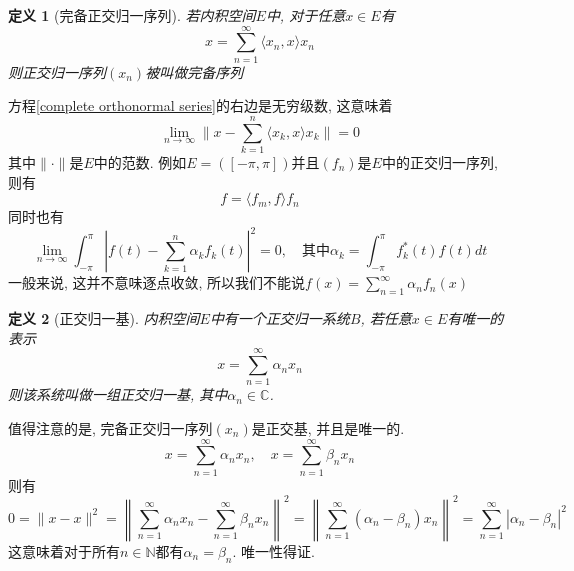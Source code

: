 \documentclass[a4paper,11pt]{book}
\newtheorem{definition}{\hspace{2em}定义}[section]
\begin{document}
\begin{definition}[完备正交归一序列]
  若内积空间$E$中, 对于任意$x\in E$有
  \begin{equation}\label{complete orthonormal series}
    x=\sum_{n=1}^{\infty}\langle x_n,x\rangle x_n
  \end{equation}
  则正交归一序列$(x_n)$被叫做完备序列
\end{definition}
方程\eqref{complete orthonormal series}的右边是无穷级数, 这意味着
\begin{equation*}
  \lim_{n\to\infty}\|x-\sum_{k=1}^{n}\langle x_k,x\rangle x_k\|=0
\end{equation*}
其中$\|\cdot\|$是$E$中的范数. 例如$E=([-\pi,\pi])$并且$(f_n)$是$E$中的正交归一序列, 则有
\begin{equation*}
  f=\langle f_m,f\rangle f_n
\end{equation*}
同时也有
\begin{equation*}
  \lim_{n\to\infty}\int_{-\pi}^{\pi}\left|f(t)-\sum_{k=1}^{n}\alpha_k f_k(t)\right|^2=0,\quad \text{其中}\alpha_k=\int_{-\pi}^{\pi}f_k^*(t)f(t)dt
\end{equation*}
一般来说, 这并不意味逐点收敛, 所以我们不能说$f(x)=\sum_{n=1}^{\infty}\alpha_n f_n(x)$
\begin{definition}[正交归一基]
  内积空间$E$中有一个正交归一系统$B$, 若任意$x\in E$有唯一的表示
  \begin{equation*}
    x=\sum_{n=1}^{\infty}\alpha_n x_n
  \end{equation*}
  则该系统叫做一组正交归一基, 其中$\alpha_n\in \mathbb{C}$.
\end{definition}
值得注意的是, 完备正交归一序列$(x_n)$是正交基, 并且是唯一的.
\begin{equation*}
  x=\sum_{n=1}^{\infty}\alpha_n x_n,\quad x=\sum_{n=1}^{\infty}\beta_n x_n
\end{equation*}
则有
\begin{equation*}
  0=\|x-x\|^2=\left\|\sum_{n=1}^{\infty}\alpha_n x_n-\sum_{n=1}^{\infty}\beta_n x_n\right\|^2=\left\|\sum_{n=1}^{\infty}(\alpha_n-\beta_n)x_n\right\|^2=\sum_{n=1}^{\infty}|\alpha_n-\beta_n|^2
\end{equation*}
这意味着对于所有$n\in\mathbb{N}$都有$\alpha_n=\beta_n$. 唯一性得证.
\end{document}
